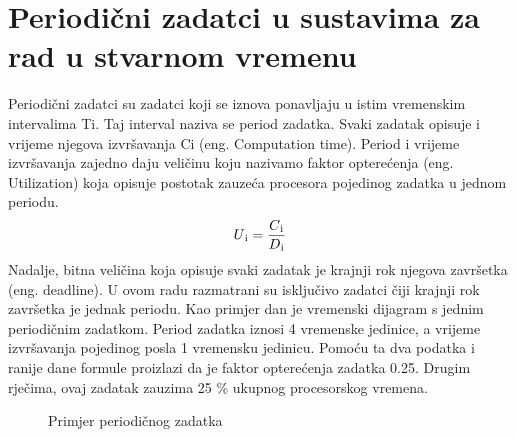 \documentclass[../zavrsni.tex]{subfiles}
\begin{document}
\section{Periodični zadatci u sustavima za rad u stvarnom vremenu}

Periodični zadatci su zadatci koji se iznova ponavljaju u istim vremenskim intervalima Ti. Taj interval naziva se period zadatka.
Svaki zadatak opisuje i vrijeme njegova izvršavanja Ci (eng. Computation time). Period i vrijeme izvršavanja zajedno daju veličinu 
koju nazivamo faktor opterećenja (eng. Utilization) koja opisuje postotak zauzeća procesora pojedinog zadatka u jednom periodu.
\begin{equation*}
    U\textsubscript{i} = \frac{C\textsubscript{i}}{D\textsubscript{i}}
\end{equation*}
Nadalje, bitna veličina koja opisuje svaki zadatak je krajnji rok njegova završetka (eng. deadline). U ovom radu razmatrani su 
isključivo zadatci čiji krajnji rok završetka je jednak periodu. Kao primjer dan je vremenski dijagram s jednim periodičnim zadatkom.
Period zadatka iznosi 4 vremenske jedinice, a vrijeme izvršavanja pojedinog posla 1 vremensku jedinicu. Pomoću ta dva podatka i ranije 
dane formule proizlazi da je faktor opterećenja zadatka 0.25. Drugim rječima, ovaj zadatak zauzima 25 \% ukupnog procesorskog vremena.
\begin{figure}[h]
    \centering

    \begin{RTGrid}[width=13cm]{1}{20}

  

    \end{RTGrid}

    \caption{Primjer periodičnog zadatka}
    \label{fig:ex1}
  \end{figure}
\end{document}

